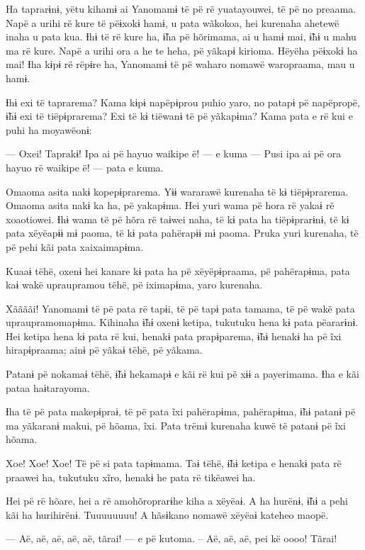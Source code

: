 Ha taprarɨnɨ, yëtu kihamɨ ai Yanomamɨ të pë rë yuatayouwei, të pë no
preaama. Napë a urihi rë kure të pëɨxokɨ hamɨ, u pata wãkokoa, hei
kurenaha ahetewë inaha u pata kua. Ɨhɨ të rë kure ha, ɨ̃ha pë hõrimama,
ai u hamɨ mai, ɨ̃hɨ u mahu ma rë kure. Napë a urihi ora a he te heha, pë
yãkapɨ kirioma. Hëyëha pëɨxokɨ ha mai! Ɨha kɨpɨ rë rëpɨre ha, Yanomamɨ
të pë waharo nomawë waropraama, mau u hamɨ. 

Ɨhɨ exi të taprarema? Kama kɨpɨ napëpɨprou puhio yaro, no patapɨ pë
napëpropë, ɨ̃hɨ exi të tiëpɨprarema? Exi të kɨ tiëwanɨ të pë yãkapɨma?
Kama pata e rë kui e puhi ha moyawëonɨ: 

— Oxei! Taprakɨ! Ipa ai pë hayuo waikipe ë! --- e kuma --- Pusi ipa ai pë
ora hayuo rë waikipe ë! --- pata e kuma. 

Omaoma asita nakɨ kopepɨprarema. Yɨɨ wararawë kurenaha të kɨ
tiëpɨprarema. Omaoma asita nakɨ ka ha, pë yakapɨma. Hei yuri wama pë
hora rë yakaɨ rë xoaotiowei. Ɨhɨ wama të pë hõra rë taɨwei naha, të kɨ
pata ha tiëpɨprarɨnɨ, të kɨ pata xëyëapɨɨ mɨ paoma, të kɨ pata pahërapɨɨ
mɨ paoma. Pruka yuri kurenaha, të pë pehi kãi pata xaixaimapɨma. 

Kuaaɨ tëhë, oxenɨ hei kanare kɨ pata ha pë xëyëpɨpraama, pë pahërapɨma,
pata kaɨ wakë upraupramou tëhë, pë iximapɨma, yaro kurenaha. 

Xããããi! Yanomamɨ të pë pata rë tapɨi, të pë tapɨ pata tamama, të pë wakë
pata upraupramomapɨma. Kihinaha ɨ̃hɨ oxenɨ ketipa, tukutuku hena kɨ pata
pëararɨnɨ. Hei ketipa hena kɨ pata rë kui, henakɨ pata prapɨparema, ɨ̃hɨ
henakɨ ha pë ĩxi hirapɨpraama; ainɨ pë yãkaɨ tëhë, pë yãkama. 

Patanɨ pë nokamaɨ tëhë, ɨ̃hɨ hekamapɨ e kãi rë kui pë xɨɨ a payerimama.
Ɨha e kãi pataa haɨtarayoma. 

Ɨha të pë pata makepɨpraɨ, të pë pata ĩxi pahërapɨma, pahërapɨma, ɨ̃hɨ
patanɨ pë ma yãkaranɨ makui, pë hõama, ĩxi. Pata trëmɨ kurenaha kuwë të
patanɨ pë ĩxi hõama. 

 

 

Xoe! Xoe! Xoe! Të pë si pata tapɨmama. Taɨ tëhë, ɨ̃hɨ ketipa e henakɨ
pata rë praawei ha, tukutuku xĩro, henakɨ he pata rë tikëawei ha. 

Hei pë rë hõare, hei a rë amohõroprarɨhe kiha a xëyëaɨ. A ha hurënɨ, ɨ̃hɨ
a pehi kãi ha hurihirënɨ. Tuuuuuuuu! A hãsɨkano nomawë xëyëaɨ kateheo
maopë. 

— Aë, aë, aë, aë, aë, tãrai! --- e pë kutoma. -- Aë, aë, aë, pei kë oooo!
Tãrai!


